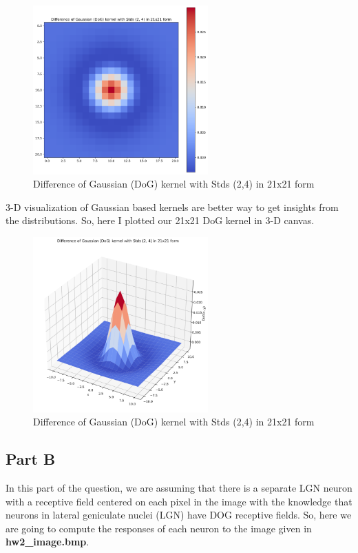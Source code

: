 \documentclass[12pt]{amsart}
\begin{document}
\begin{figure}[h]
    \centering
    \includegraphics[width = 0.6\textwidth]{images/DoG2d.png}
    \caption{Difference of Gaussian (DoG) kernel with Stds {(2,4)} in 21x21 form}
\end{figure}

3-D visualization of Gaussian based kernels are better way to get insights from the distributions. So, here I plotted our 21x21 DoG kernel in 3-D canvas.

\begin{figure}[h]
    \centering
    \includegraphics[width = 0.6\textwidth]{images/DoG3d.png}
    \caption{Difference of Gaussian (DoG) kernel with Stds {(2,4)} in 21x21 form}
\end{figure}

\subsection{Part B}
In this part of the question, we are assuming that there is a separate LGN neuron with a receptive field centered on each pixel in the image with the knowledge that neurons in lateral geniculate nuclei (LGN) have DOG receptive fields. So, here we are going to compute the responses of each neuron to the image given in \textbf{hw2\_image.bmp}.
\end{document}
